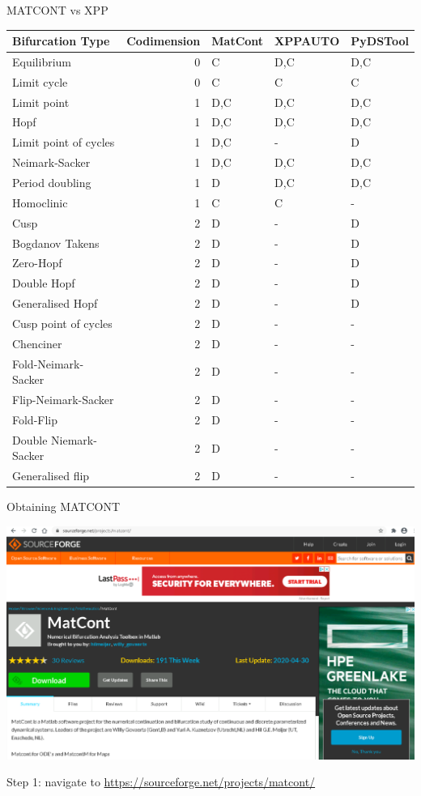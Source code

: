 \documentclass[presentation]{beamer}
\begin{document}
\begin{frame}[label={sec:org197f943},plain]{MATCONT vs XPP}
\begin{center}
\begin{tabular}{lrlll}
\hline
Bifurcation Type & Codimension & MatCont & XPPAUTO & PyDSTool\\
\hline
Equilibrium & 0 & C & D,C & D,C\\
Limit cycle & 0 & C & C & C\\
Limit point & 1 & D,C & D,C & D,C\\
Hopf & 1 & D,C & D,C & D,C\\
Limit point of cycles & 1 & D,C & - & D\\
Neimark-Sacker & 1 & D,C & D,C & D,C\\
Period doubling & 1 & D & D,C & D,C\\
Homoclinic & 1 & C & C & -\\
Cusp & 2 & D & - & D\\
Bogdanov Takens & 2 & D & - & D\\
Zero-Hopf & 2 & D & - & D\\
Double Hopf & 2 & D & - & D\\
Generalised Hopf & 2 & D & - & D\\
Cusp point of cycles & 2 & D & - & -\\
Chenciner & 2 & D & - & -\\
Fold-Neimark-Sacker & 2 & D & - & -\\
Flip-Neimark-Sacker & 2 & D & - & -\\
Fold-Flip & 2 & D & - & -\\
Double Niemark-Sacker & 2 & D & - & -\\
Generalised flip & 2 & D & - & -\\
\hline
\end{tabular}
\end{center}
\end{frame}
\begin{frame}[label={sec:org51d03a8},plain]{Obtaining MATCONT}
\begin{center}
\includegraphics[width=.9\linewidth]{./MATCONT_site.png}
\end{center}

Step 1: navigate to \url{https://sourceforge.net/projects/matcont/}
\end{frame}
\end{document}
